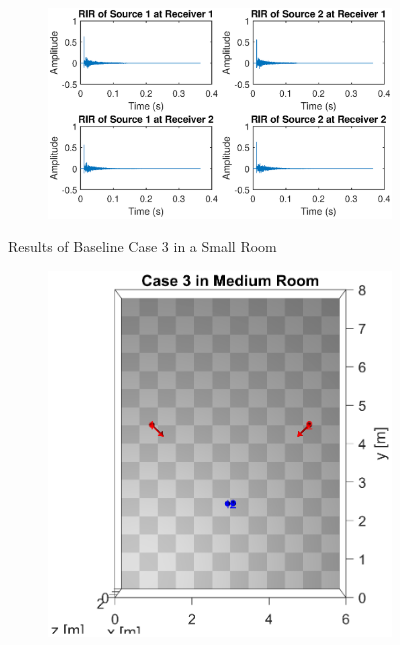 \documentclass[a4paper,twoside,12pt,hidelinks]{article}
\begin{document}
\begin{appendices}
\begin{figure}[H]
\begin{subfigure}[H]{0.6\textwidth}
\includegraphics[width=\textwidth]{3s_ir}
\end{subfigure}
\caption{Results of Baseline Case 3 in a Small Room}
\end{figure}
\begin{figure}[H]
\centering
\begin{subfigure}[H]{0.35\textwidth}
\includegraphics[width=\textwidth]{3m_lo}
\end{subfigure}
\begin{subfigure}[H]{0.6\textwidth}

\end{subfigure}
\end{figure}
\end{appendices}
\end{document}
